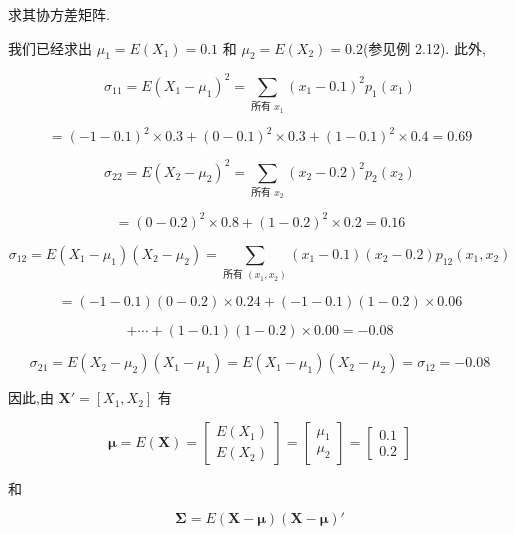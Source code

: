 求其协方差矩阵.

我们已经求出 $\mu_1=E(X_1)=0.1$ 和 $\mu_2=E(X_2)=0.2$(参见例 2.12). 此外,

\[
\sigma_{11}=E(X_1-\mu_1)^2=\sum_{\text{所有 }x_1}(x_1-0.1)^2p_1(x_1)
\]

\[
=(-1-0.1)^2\times 0.3+(0-0.1)^2\times 0.3+(1-0.1)^2\times 0.4=0.69
\]

\[
\sigma_{22}=E(X_2-\mu_2)^2=\sum_{\text{所有 }x_2}(x_2-0.2)^2p_2(x_2)
\]

\[
=(0-0.2)^2\times 0.8+(1-0.2)^2\times 0.2=0.16
\]

\[
\sigma_{12}=E(X_1-\mu_1)(X_2-\mu_2)=\sum_{\text{所有 }(x_1,x_2)}(x_1-0.1)(x_2-0.2)p_{12}(x_1,x_2)
\]

\[
=(-1-0.1)(0-0.2)\times 0.24+(-1-0.1)(1-0.2)\times 0.06
\]

\[
+\cdots+(1-0.1)(1-0.2)\times 0.00=-0.08
\]

\[
\sigma_{21}=E(X_2-\mu_2)(X_1-\mu_1)=E(X_1-\mu_1)(X_2-\mu_2)=\sigma_{12}=-0.08
\]

因此,由 $\bm{X}'=[X_1,X_2]$ 有

\[
\bm{\mu}=E(\bm{X})=\begin{bmatrix}E(X_1)\\E(X_2)\end{bmatrix}=\begin{bmatrix}\mu_1\\\mu_2\end{bmatrix}=\begin{bmatrix}0.1\\0.2\end{bmatrix}
\]

和

\[
\bm{\Sigma}=E(\bm{X}-\bm{\mu})(\bm{X}-\bm{\mu})'
\]
